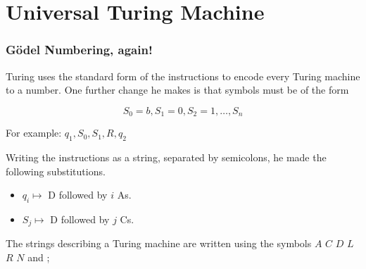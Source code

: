 \documentclass{beamer}
\begin{document}
\section{Universal Turing Machine}
\begin{frame}
	\frametitle{G\"{o}del Numbering, again!}
	
	Turing uses the standard form of the instructions to encode every Turing machine to a number. One further change he makes is that symbols must be of the form 

	$$S_{0} = b, S_{1} = 0, S_{2} = 1, \dots , S_{n} $$
	
	For example: $q_{1},S_{0},S_{1},R,q_{2}$

	\vspace{0.5cm}

	Writing the instructions as a string, separated by semicolons, he made the following substitutions.

	\begin{itemize}
		\item $q_{i} \mapsto $ D followed by $i$ As.
		\item $S_{j} \mapsto $ D followed by $j$ Cs.
	\end{itemize}

	The strings describing a Turing machine are written using the symbols $A$ $C$ $D$ $L$ $R$ $N$ and ; %

	\vspace{2cm}

\end{frame}
\end{document}
